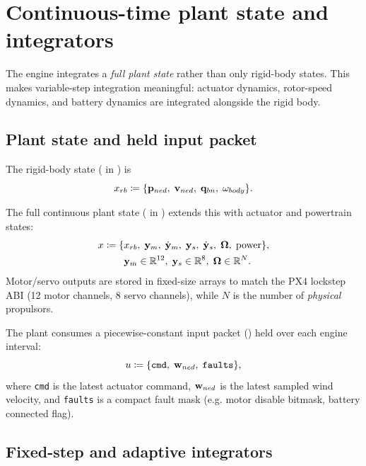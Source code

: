 \section{Continuous-time plant state and integrators}
\label{sec:plant-state}

The engine integrates a \emph{full plant state} rather than only rigid-body states. This makes variable-step integration meaningful: actuator dynamics, rotor-speed dynamics, and battery dynamics are integrated alongside the rigid body.

\subsection{Plant state and held input packet}

The rigid-body state ( in ) is
\begin{equation}
  x_{rb} \coloneqq \{\mathbf{p}_{ned},\; \mathbf{v}_{ned},\; \mathbf{q}_{bn},\; \mathbf{\omega}_{body}\}.
\end{equation}

The full continuous plant state ( in ) extends this with actuator and powertrain states:
\begin{align}
  x \coloneqq \{&x_{rb},\; \mathbf{y}_m,\; \dot{\mathbf{y}}_m,\; \mathbf{y}_s,\; \dot{\mathbf{y}}_s,\; \mathbf{\Omega},\; \text{power}\},\\
  &\mathbf{y}_m\in\mathbb{R}^{12},\; \mathbf{y}_s\in\mathbb{R}^{8},\; \mathbf{\Omega}\in\mathbb{R}^{N}.
\end{align}
Motor/servo outputs are stored in fixed-size arrays to match the PX4 lockstep ABI (12 motor channels, 8 servo channels), while $N$ is the number of \emph{physical} propulsors.

The plant consumes a piecewise-constant input packet () held over each engine interval:
\begin{equation}
  u \coloneqq \{\mathtt{cmd},\; \mathbf{w}_{ned},\; \mathtt{faults}\},
\end{equation}
where \texttt{cmd} is the latest actuator command, $\mathbf{w}_{ned}$ is the latest sampled wind velocity, and \texttt{faults} is a compact fault mask (e.g. motor disable bitmask, battery connected flag).

\subsection{Fixed-step and adaptive integrators}
\label{sec:integrators}

